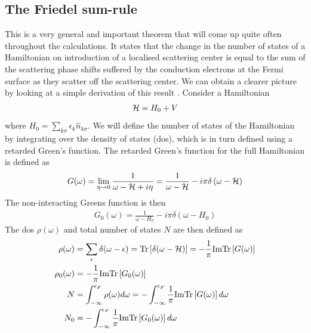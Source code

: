 \documentclass[12pt,twoside]{article}
\numberwithin{equation}{section}
\begin{document}
\subsection{The Friedel sum-rule}
This is a very general and important theorem that will come up  quite often throughout the calculations. It states that the change in the number of states of a Hamiltonian on introduction of a localised scattering center is equal to the sum of the scattering phase shifts suffered by the conduction electrons at the Fermi surface as they scatter off the scattering center. We can obtain a clearer picture by looking at a simple derivation of this result \cite{hewson}.
\pb Consider a Hamiltonian
\begin{equation}\begin{aligned}
	\mathcal{H} = H_0 + V
\end{aligned}\end{equation}
where \(H_0 = \sum_{k\sigma}\epsilon_k \hat n_{k\sigma}\). We will define the number of states of the Hamiltonian by integrating over the density of states (dos), which is in turn defined using a retarded Green's function. The retarded Green's function for the full Hamiltonian is defined as
\begin{equation}\begin{aligned}
	G(\omega) = \lim_{\eta \to 0}\frac{1}{\omega - \mathcal{H} + i\eta} = \frac{1}{\omega - \mathcal{H}} - i\pi\delta\left(\omega - \mathcal{H}\right)
\end{aligned}\end{equation}
The non-interacting Greens function is then
\begin{equation}\begin{aligned}
	G_0(\omega) = \frac{1}{\omega - H_0} - i\pi\delta\left(\omega - H_0\right)
\end{aligned}\end{equation}
The dos \(\rho(\omega)\) and total number of states \(N\) are then defined as
\begin{equation}\begin{aligned}
	\rho(\omega) &= \sum_\epsilon \delta(\omega - \epsilon) = \text{Tr}\left[ \delta(\omega - \mathcal{H}) \right] = - \frac{1}{\pi}\text{Im} \text{Tr}\left[ G(\omega) \right]\\
	\rho_0(\omega) &=  -\frac{1}{\pi}\text{Im} \text{Tr}\left[ G_0(\omega) \right]\\
	N &= \int_{-\infty}^{\epsilon_F} \rho(\omega) d\omega = - \int_{-\infty}^{\epsilon_F} \frac{1}{\pi}\text{Im} \text{Tr}\left[ G(\omega) \right]d\omega\\
	N_0 &= - \int_{-\infty}^{\epsilon_F} \frac{1}{\pi}\text{Im} \text{Tr}\left[ G_0(\omega) \right]d\omega
\end{aligned}\end{equation}
\end{document}
